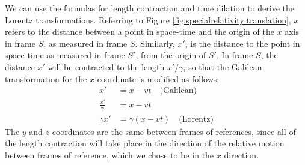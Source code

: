 We can use the formulas for length contraction and time dilation to derive the Lorentz transformations. Referring to Figure \ref{fig:specialrelativity:translation}, $x$ refers to the distance between a point in space-time and the origin of the $x$ axis in frame $S$, as measured in frame $S$. Similarly, $x'$, is the distance to the point in space-time as measured in frame $S'$, from the origin of $S'$. In frame  $S$, the distance $x'$ will be contracted to the length $x'/\gamma$, so that the Galilean transformation for the $x$ coordinate is modified as follows:
\begin{align*}
x' &= x - vt\quad\text{(Galilean)}\\
\frac{x'}{\gamma} &= x - vt\\
\therefore x'&=\gamma (x-vt)\quad\text{(Lorentz)}
\end{align*}
The $y$ and $z$ coordinates are the same between frames of references, since all of the length contraction will take place in the direction of the relative motion between frames of reference, which we chose to be in the $x$ direction.

